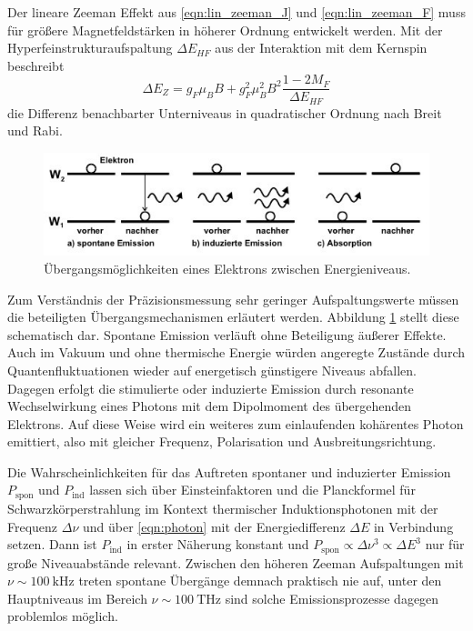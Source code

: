 Der lineare Zeeman Effekt aus \eqref{eqn:lin_zeeman_J} und \eqref{eqn:lin_zeeman_F} muss für größere Magnetfeldstärken
in höherer Ordnung entwickelt werden. Mit der Hyperfeinstrukturaufspaltung $\Delta E_{HF}$ aus der Interaktion mit dem Kernspin
beschreibt
\begin{equation}
	\Delta E_Z = g_F \mu_B B + g_F^2 \mu_B^2 B^2 \frac{1 - 2M_F}{\Delta E_{HF}}
	\label{eqn:quad_zeeman}
\end{equation}
die Differenz benachbarter Unterniveaus in quadratischer Ordnung nach Breit und Rabi.

\begin{figure}[H]
	\centering
	\includegraphics[width=0.75\linewidth]{content/grafik/uebergang.jpg}
	\caption{Übergangsmöglichkeiten eines Elektrons zwischen Energieniveaus. \cite{pumpen}}
	\label{fig:uebergang}
\end{figure}

Zum Verständnis der Präzisionsmessung sehr geringer Aufspaltungswerte müssen die beteiligten Übergangsmechanismen erläutert werden.
Abbildung \ref{fig:uebergang} stellt diese schematisch dar. Spontane Emission verläuft ohne Beteiligung äußerer Effekte. Auch im
Vakuum und ohne thermische Energie würden angeregte Zustände durch Quantenfluktuationen wieder auf energetisch günstigere
Niveaus abfallen. Dagegen erfolgt die stimulierte oder induzierte Emission durch resonante Wechselwirkung eines Photons mit dem
Dipolmoment des übergehenden Elektrons. Auf diese Weise wird ein weiteres zum einlaufenden kohärentes Photon emittiert, also mit
gleicher Frequenz, Polarisation und Ausbreitungsrichtung. 

Die Wahrscheinlichkeiten für das Auftreten spontaner und induzierter Emission $P_\text{spon}$ und $P_\text{ind}$ lassen sich
über Einsteinfaktoren und die Planckformel für Schwarzkörperstrahlung im Kontext thermischer Induktionsphotonen mit der
Frequenz $\Delta\nu$ und über \eqref{eqn:photon} mit der Energiedifferenz $\Delta E$ in Verbindung setzen. Dann ist $P_\text{ind}$
in erster Näherung konstant und $P_\text{spon} \propto \Delta\nu^3 \propto \Delta E^3$ nur für große Niveauabstände relevant.
Zwischen den höheren Zeeman Aufspaltungen mit $\nu \sim \qty{100}{\kilo\hertz}$ treten spontane Übergänge demnach praktisch nie auf,
unter den Hauptniveaus im Bereich $\nu \sim \qty{100}{\tera\hertz}$ sind solche Emissionsprozesse dagegen problemlos möglich. 

